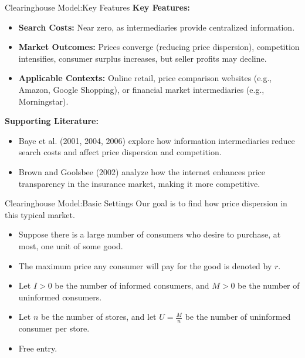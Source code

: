 \documentclass[aspectratio=169]{beamer}  %
\begin{document}
\begin{frame}{Clearinghouse Model:Key Features}
    \textbf{Key Features:}
    \begin{itemize}
        \item \textbf{Search Costs:} Near zero, as intermediaries provide centralized information.
        \item \textbf{Market Outcomes:} Prices converge (reducing price dispersion), competition intensifies, consumer surplus increases, but seller profits may decline.
        \item \textbf{Applicable Contexts:} Online retail, price comparison websites (e.g., Amazon, Google Shopping), or financial market intermediaries (e.g., Morningstar).
    \end{itemize}
    \textbf{Supporting Literature:}
    \begin{itemize}
        \item Baye et al. (2001, 2004, 2006) explore how information intermediaries reduce search costs and affect price dispersion and competition.
        \item Brown and Goolsbee (2002) analyze how the internet enhances price transparency in the insurance market, making it more competitive.
    \end{itemize}
\end{frame}

\begin{frame}{Clearinghouse Model:Basic Settings}
    Our goal is to find how price dispersion in this typical market.
    \begin{itemize}
        \item Suppose there is a large number of consumers who desire to purchase, at most, one unit of some good.
        \item The maximum price any consumer will pay for the good is denoted by $r$.
        \item Let $I>0$ be the number of informed consumers, and $M>0$ be the number of uninformed consumers.
        \item Let $n$ be the number of stores, and let $U=\frac{M}{n}$ be the number of uninformed consumer per store. 
        \item Free entry.
    \end{itemize}
\end{frame}
\end{document}
